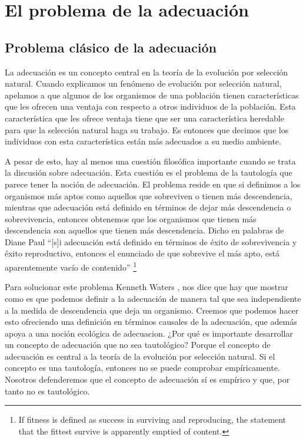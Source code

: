 
\chapter{El problema de la adecuación}

\section{Problema clásico de la adecuación}


\noindent La adecuación es un concepto central en la teoría de la evolución por selección natural. Cuando explicamos un fenómeno de evolución por selección natural, apelamos a que algunos de los organismos de una población tienen características que les ofrecen una ventaja con respecto a otros individuos de la población. Esta característica que les ofrece ventaja tiene que ser una característica heredable para que la selección natural haga su trabajo. Es entonces que decimos que los individuos con esta característica están más adecuados a su medio ambiente.

A pesar de esto, hay al menos una cuestión filosófica importante cuando se trata la discusión sobre adecuación. Esta cuestión es el problema de la tautología que parece tener la noción de adecuación. El problema reside en que si definimos a los organismos más aptos como aquellos que sobreviven o tienen más descendencia, mientras que adecuación está definido en términos de dejar más descendencia o sobrevivencia, entonces obtenemos que los organismos que tienen más descendencia son aquellos que tienen más descendencia. Dicho en palabras de Diane Paul ``[s]i adecuación está definido en términos de éxito de sobrevivencia y éxito reproductivo, entonces el enunciado de que sobrevive el más apto, está aparentemente vacío de contenido'' \footnote{If fitness is defined as success in surviving and reproducing, the statement that the fittest survive is apparently emptied of content.} \citeyear{Paul1992}

Para solucionar este problema Kenneth Waters \citeyear{Waters1986}, nos dice que hay que mostrar como es que podemos definir a la adecuación de manera tal que sea independiente a la medida de descendencia que deja un organismo. Creemos que podemos hacer esto ofreciendo una definición en términos causales de la adecuación, que además apoya a una noción ecológica de adecuacion.
¿Por qué es importante desarrollar un concepto de adecuación que no sea tautológico? Porque el concepto de adecuación es central a la teoría de la evolución por selección natural. Si el concepto es una tautología, entonces no se puede comprobar empíricamente. Nosotros defenderemos que el concepto de adecuación sí es empírico y que, por tanto no es tautológico.

